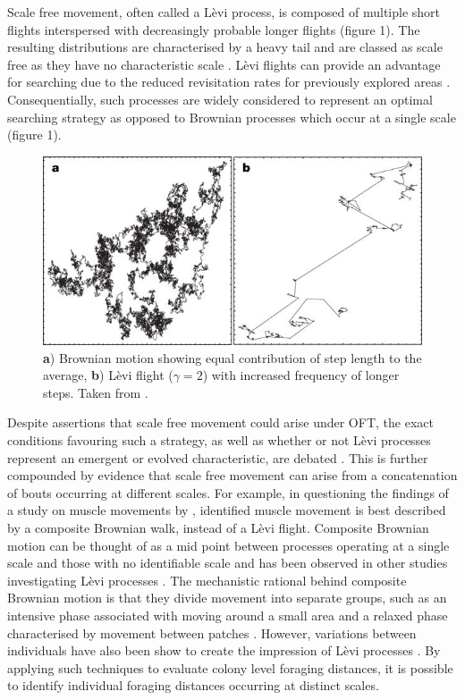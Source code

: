 \documentclass[11pt,usenames,dvipsnames]{article}
\begin{document}
Scale free movement, often called a L\`evi process, is composed of multiple short flights interspersed with decreasingly probable longer flights (figure 1). The resulting distributions are characterised by a heavy tail and are classed as scale free as they have no characteristic scale \citep{Reynolds2018}. L\`evi flights can provide an advantage for searching due to the reduced revisitation rates for previously explored areas \citep{Viswanathan1999}. Consequentially, such processes are widely considered to represent an optimal searching strategy \citep{Viswanathan1999,Humphries2014} as opposed to Brownian processes which occur at a single scale (figure 1).\\

\begin{figure}[H]
	\centering
	\includegraphics[scale=0.7]{LeviFlight.jpg}
	\caption{\textbf{a}) Brownian motion showing equal contribution of step length to the average, \textbf{b}) L\`evi flight ($\gamma = 2$) with increased frequency of longer steps. Taken from \cite{Barthelemy2008}.}
\end{figure}

Despite assertions that scale free movement could arise under OFT, the exact conditions favouring such a strategy, as well as whether or not L\`evi processes represent an emergent or evolved characteristic, are debated \citep{Wosniack2017, Pyke2015, Kolzsch2015, DeJager2013}. This is further compounded by evidence that scale free movement can arise from a concatenation of bouts occurring at different scales. For example, in questioning the findings of a study on muscle movements by \cite{DeJager2011}, \cite{Jansen2012} identified muscle movement is best described by a composite Brownian walk, instead of a L\`evi flight. Composite Brownian motion can be thought of as a mid point between processes operating at a single scale and those with no identifiable scale and has been observed in other studies investigating L\`evi processes \citep{Petrovskii2011, Sakamoto2017, Gautestad2012, Zhao2016}. The mechanistic rational behind composite Brownian motion is that they divide movement into separate groups, such as an intensive phase associated with moving around a small area and a relaxed phase characterised by movement between patches \citep{Auger-Methe2015}. However, variations between individuals have also been show to create the impression of L\`evi processes \citep{Petrovskii2011}. By applying such techniques to evaluate colony level foraging distances, it is possible to identify individual foraging distances occurring at distinct scales.
\end{document}
